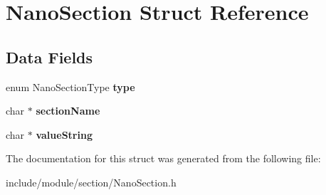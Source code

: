 \hypertarget{struct_nano_section}{}\section{Nano\+Section Struct Reference}
\label{struct_nano_section}
\subsection*{Data Fields}
\begin{DoxyCompactItemize}
\item 
\hypertarget{struct_nano_section_aeae10b894b52ddb05dceb1b2076bef58}{}\label{struct_nano_section_aeae10b894b52ddb05dceb1b2076bef58} 
enum Nano\+Section\+Type {\bfseries type}
\item 
\hypertarget{struct_nano_section_a7dadb8f2b7c0ffb34931b35b5af02e99}{}\label{struct_nano_section_a7dadb8f2b7c0ffb34931b35b5af02e99} 
char $\ast$ {\bfseries section\+Name}
\item 
\hypertarget{struct_nano_section_a8037948a06654abd0c88a662e924f832}{}\label{struct_nano_section_a8037948a06654abd0c88a662e924f832} 
char $\ast$ {\bfseries value\+String}
\end{DoxyCompactItemize}


The documentation for this struct was generated from the following file\+:\begin{DoxyCompactItemize}
\item 
include/module/section/Nano\+Section.\+h\end{DoxyCompactItemize}
